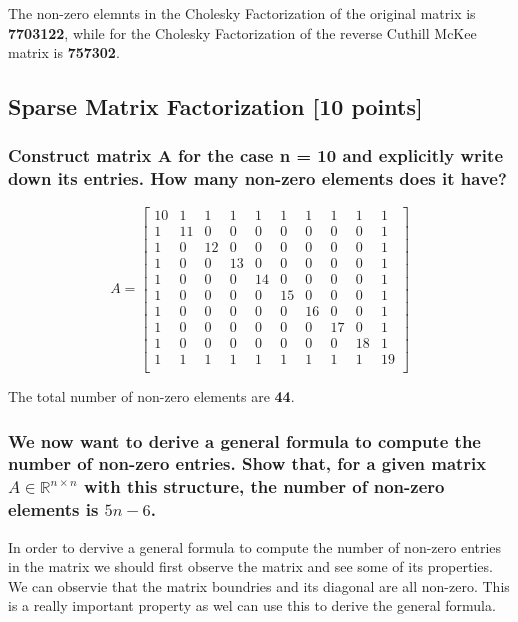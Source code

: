 \documentclass[unicode,11pt,a4paper,oneside,numbers=endperiod,openany]{scrartcl}
\begin{document}
The non-zero elemnts in the Cholesky Factorization of the original matrix is \textbf{7703122}, while for the Cholesky Factorization of the reverse Cuthill McKee matrix is \textbf{757302}.
\subsection{Sparse Matrix Factorization [10 points]}
\subsubsection{Construct matrix A for the case n = 10 and explicitly write down its entries. How many non-zero elements does it have?}
\[ A =
    \begin{bmatrix}
        10 & 1  & 1  & 1  & 1  & 1  & 1  & 1  & 1  & 1  \\
        1  & 11 & 0  & 0  & 0  & 0  & 0  & 0  & 0  & 1  \\
        1  & 0  & 12 & 0  & 0  & 0  & 0  & 0  & 0  & 1  \\
        1  & 0  & 0  & 13 & 0  & 0  & 0  & 0  & 0  & 1  \\
        1  & 0  & 0  & 0  & 14 & 0  & 0  & 0  & 0  & 1  \\
        1  & 0  & 0  & 0  & 0  & 15 & 0  & 0  & 0  & 1  \\
        1  & 0  & 0  & 0  & 0  & 0  & 16 & 0  & 0  & 1  \\
        1  & 0  & 0  & 0  & 0  & 0  & 0  & 17 & 0  & 1  \\
        1  & 0  & 0  & 0  & 0  & 0  & 0  & 0  & 18 & 1  \\
        1  & 1  & 1  & 1  & 1  & 1  & 1  & 1  & 1  & 19 \\
    \end{bmatrix}
\]

The total number of non-zero elements are \textbf{44}.

\subsubsection{We now want to derive a general formula to compute the number of non-zero entries. Show that, for a given matrix \texorpdfstring{\(A \in \mathbb{R}^{n \times n}\)}{A in R^n x n} with this structure, the number of non-zero elements is \(5n - 6\).}

In order to dervive a general formula to compute the number of non-zero entries in the matrix we should first observe the matrix and see some of its properties. We can observie that the matrix boundries and its diagonal are all non-zero. This is a really important property as wel can use this to derive the general formula. \\
\end{document}
